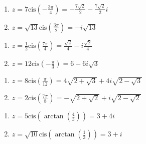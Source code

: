 \documentclass{ximera}
\begin{document}
\begin{multicols}{2} 

\begin{enumerate}

\setcounter{enumi}{\value{HW}}

\item $z = 7\text{cis}\left(-\frac{3\pi}{4}\right) = -\frac{7\sqrt{2}}{2} - \frac{7\sqrt{2}}{2}i$ 
\item $z = \sqrt{13}\text{cis}\left(\frac{3\pi}{2}\right) = -i\sqrt{13}$ 

\setcounter{HW}{\value{enumi}}

\end{enumerate}

\end{multicols}

\begin{multicols}{2} 

\begin{enumerate}

\setcounter{enumi}{\value{HW}}

\item $z = \frac{1}{2}\text{cis}\left(\frac{7\pi}{4}\right) = \frac{\sqrt{2}}{4} - i\frac{\sqrt{2}}{4}$ 
\item $z = 12\text{cis}\left(-\frac{\pi}{3}\right) = 6 - 6i\sqrt{3}$ 

\setcounter{HW}{\value{enumi}}

\end{enumerate}

\end{multicols}

\begin{multicols}{2} 

\begin{enumerate}

\setcounter{enumi}{\value{HW}}

\item $z = 8\text{cis}\left(\frac{\pi}{12}\right) = 4\sqrt{2+\sqrt{3}}+4i\sqrt{2-\sqrt{3}}$ 
\item $z = 2\text{cis}\left(\frac{7\pi}{8}\right) = -\sqrt{2 + \sqrt{2}} + i\sqrt{2 - \sqrt{2}}$ 

\setcounter{HW}{\value{enumi}}

\end{enumerate}

\end{multicols}

\begin{multicols}{2} 

\begin{enumerate}

\setcounter{enumi}{\value{HW}}

\item $z = 5\text{cis}\left(\arctan\left(\frac{4}{3}\right)\right) = 3 + 4i$ 
\item $z = \sqrt{10}\text{cis}\left(\arctan\left(\frac{1}{3}\right)\right) = 3+i$ 

\setcounter{HW}{\value{enumi}}

\end{enumerate}

\end{multicols}
\end{document}
